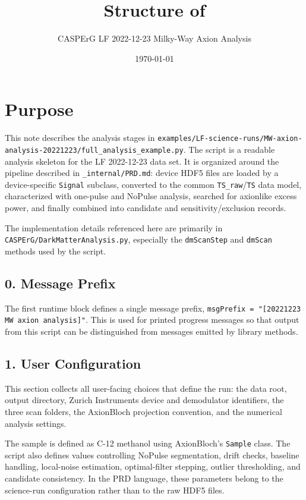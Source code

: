 \documentclass[11pt]{article}
\title{Structure of \file{full\_analysis\_example.py}}
\author{CASPErG LF 2022-12-23 Milky-Way Axion Analysis}
\date{\today}
\newcommand{\code}[1]{\texttt{#1}}
\newcommand{\file}[1]{\texttt{#1}}
\begin{document}
\maketitle

\section{Purpose}

This note describes the analysis stages in
\file{examples/LF-science-runs/MW-axion-analysis-20221223/full\_analysis\_example.py}.
The script is a readable analysis skeleton for the LF 2022-12-23 data set. It
is organized around the pipeline described in \file{\_internal/PRD.md}: device
HDF5 files are loaded by a device-specific \code{Signal} subclass, converted to
the common \code{TS\_raw}/\code{TS} data model, characterized with one-pulse
and NoPulse analysis, searched for axionlike excess power, and finally combined
into candidate and sensitivity/exclusion records.

The implementation details referenced here are primarily in
\file{CASPErG/DarkMatterAnalysis.py}, especially the \code{dmScanStep} and
\code{dmScan} methods used by the script.

\subsection{0. Message Prefix}

The first runtime block defines a single message prefix,
\code{msgPrefix = "[20221223 MW axion analysis]"}. This is used for printed
progress messages so that output from this script can be distinguished from
messages emitted by library methods.

\subsection{1. User Configuration}

This section collects all user-facing choices that define the run: the data
root, output directory, Zurich Instruments device and demodulator identifiers,
the three scan folders, the AxionBloch projection convention, and the numerical
analysis settings.

The sample is defined as C-12 methanol using AxionBloch's \code{Sample} class.
The script also defines values controlling NoPulse segmentation, drift checks,
baseline handling, local-noise estimation, optimal-filter stepping, outlier
thresholding, and candidate consistency. In the PRD language, these parameters
belong to the science-run configuration rather than to the raw HDF5 files.
\end{document}
